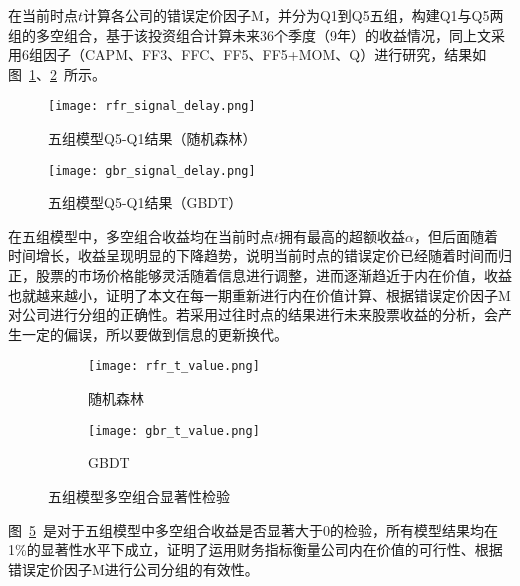 在当前时点$t$计算各公司的错误定价因子M，并分为Q1到Q5五组，构建Q1与Q5两组的多空组合，基于该投资组合计算未来36个季度（9年）的收益情况，同上文采用6组因子（CAPM、FF3、FFC、FF5、FF5+MOM、Q）进行研究，结果如图~\ref{signal1}、\ref{signal2}~所示。

\begin{figure}[htbp]
  \centering
    \texttt{[image: rfr\_signal\_delay.png]}
    \caption{五组模型Q5-Q1结果（随机森林）}
    \label{signal1}
\end{figure}

\begin{figure}[htbp]
  \centering
    \texttt{[image: gbr\_signal\_delay.png]}
    \caption{五组模型Q5-Q1结果（GBDT）}
    \label{signal2}
\end{figure}

在五组模型中，多空组合收益均在当前时点$t$拥有最高的超额收益$\alpha$，但后面随着时间增长，收益呈现明显的下降趋势，说明当前时点的错误定价已经随着时间而归正，股票的市场价格能够灵活随着信息进行调整，进而逐渐趋近于内在价值，收益也就越来越小，证明了本文在每一期重新进行内在价值计算、根据错误定价因子M对公司进行分组的正确性。若采用过往时点的结果进行未来股票收益的分析，会产生一定的偏误，所以要做到信息的更新换代。
\begin{figure}[htbp]
  \centering
   \begin{subfigure}[b]{0.48\textwidth}
     \centering
    \texttt{[image: rfr\_t\_value.png]}
    \caption{随机森林}
    \label{t1}
    \end{subfigure}
    \hfill
     \begin{subfigure}[b]{0.48\textwidth}
       \centering
    \texttt{[image: gbr\_t\_value.png]}
    \caption{GBDT}
    \label{t2}
    \end{subfigure}
    \caption{五组模型多空组合显著性检验}
    \label{t}
\end{figure}

图~\ref{t}~是对于五组模型中多空组合收益是否显著大于0的检验，所有模型结果均在1\%的显著性水平下成立，证明了运用财务指标衡量公司内在价值的可行性、根据错误定价因子M进行公司分组的有效性。




